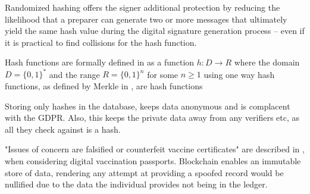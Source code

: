  Randomized hashing offers the signer additional protection by reducing the likelihood that a preparer can generate two or more messages 
that ultimately yield the same hash value during the digital signature generation process – even if it is practical to find collisions for the hash function. 

Hash functions are formally defined in \cite{rompay_analysis_nodate} as a function \begin{math} h: D \rightarrow R \end{math} where the domain \begin{math} D = \{0,1\}^* \end{math} and the range \begin{math} R = \{0,1\}^n \end{math} for some \begin{math} n \geq 1 \end{math}
using one way hash functions, as defined by Merkle in \cite{merkle_secrecy_1979}, are hash functions

Storing only hashes in the database, keeps data anonymous and is complacent with the GDPR. 
Also, this keeps the private data away from any verifiers etc, as all they check against is a hash.

"Issues of concern are falsified or counterfeit vaccine certificates" are described in \cite{schlagenhauf_variants_2021}, when considering digital vaccination passports. 
Blockchain enables an immutable store of data, rendering any attempt at providing a spoofed record would be nullified due to the data the individual provides not being in the ledger.
